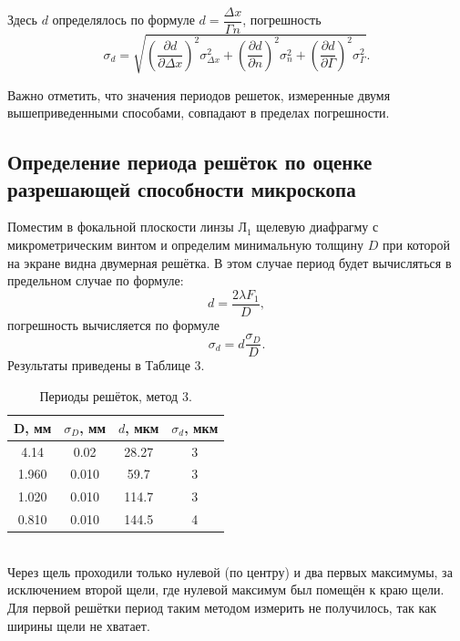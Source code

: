 \documentclass[a4paper,12pt]{report}
\begin{document}
Здесь $d$ определялось по формуле $d = \dfrac{\Delta x}{\Gamma n}$, погрешность
$$
\sigma_d = \sqrt{\left(\dfrac{\partial d}{\partial \Delta x}\right)^2 \sigma^2_{\Delta x} + \left(\dfrac{\partial d}{\partial n}\right)^2 \sigma^2_{n} + \left(\dfrac{\partial d}{\partial \Gamma}\right)^2 \sigma^2_{\Gamma}}.
$$

Важно отметить, что значения периодов решеток, измеренные двумя вышеприведенными способами, совпадают в пределах погрешности.

\subsection*{Определение периода решёток по оценке разрешающей способности микроскопа}
Поместим в фокальной плоскости линзы $\text{Л}_1$ щелевую диафрагму с микрометрическим винтом и определим минимальную толщину $D$ при которой на экране видна двумерная решётка. В этом случае период будет вычисляться в предельном случае по формуле:
$$
d = \dfrac{2\lambda F_1}{D},
$$
погрешность вычисляется по формуле 
$$
\sigma_d = d \dfrac{\sigma_D}{D}.
$$
Результаты приведены в Таблице 3.
\begin{table}[h]
\begin{tabular}{|c|c|c|c|}
\hline
D, мм & $\sigma_D$, мм & $d$, мкм & $\sigma_d$, мкм \\ \hline
4.14  & 0.02           & 28.27    & 3            \\ \hline
1.960 & 0.010          & 59.7     & 3             \\ \hline
1.020 & 0.010          & 114.7    & 3             \\ \hline
0.810 & 0.010          & 144.5    & 4             \\ \hline
\end{tabular}
\centering
\caption{Периоды решёток, метод 3.}
\end{table}\\
Через щель проходили только нулевой (по центру) и два первых максимумы, за исключением второй щели, где нулевой максимум был помещён к краю щели. Для первой решётки период таким методом измерить не получилось, так как ширины щели не хватает.
\newpage
\end{document}

